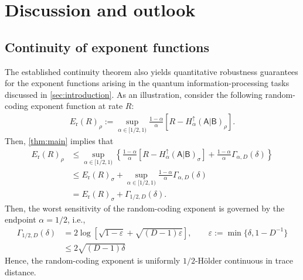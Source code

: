 \documentclass[11pt,reqno]{amsart}
\theoremstyle{definition}
\newcommand{\A}{\mathsf{A}}
\newcommand{\B}{\mathsf{B}}
\begin{document}
\section{Discussion and outlook}\label{sec:discussion}

\subsection{Continuity of exponent functions}
The established continuity theorem also yields quantitative robustness guarantees for
the exponent functions arising in the quantum information-processing tasks
discussed in \cref{sec:introduction}.  As an illustration, consider the
following random-coding exponent function at rate \(R\):
\begin{align}
    E_{\mathrm{r}}(R)_{\rho}
    := \sup_{\alpha \in [1/2,1)}  \frac{1-\alpha}{\alpha} \left[ R - H_{\alpha}^{\uparrow}(\A|\B)_{\rho} \right].
\end{align}
Then, \cref{thm:main} implies that
\begin{align}
    E_{\mathrm{r}}(R)_{\rho}
    &\leq \sup_{\alpha \in [1/2,1)} \left\{ \frac{1-\alpha}{\alpha} \left[ R - H_{\alpha}^{\uparrow}(\A|\B)_{\sigma} \right] + \frac{1-\alpha}{\alpha} \Gamma_{\alpha,D}(\delta) \right\}
    \\
    &\leq E_{\mathrm{r}}(R)_{\sigma} + \sup_{\alpha \in [1/2,1)} \frac{1-\alpha}{\alpha} \Gamma_{\alpha,D}(\delta)
    \\
    &= E_{\mathrm{r}}(R)_{\sigma} + \Gamma_{1/2,D}(\delta).
\end{align}
Then, the worst sensitivity of the random-coding exponent is governed by the endpoint $\alpha = 1/2$, i.e.,
\begin{align}
    \Gamma_{1/2,D}(\delta)
    &= 2 \log \left[ \sqrt{1-\varepsilon} + \sqrt{(D-1)\varepsilon} \right],
    \qquad \varepsilon := \min\{\delta, 1-D^{-1}\}
    \\
    &\leq
    2\sqrt{(D-1)\delta}
\end{align}
Hence, the random-coding exponent is uniformly $1/2$-H\"older continuous in trace distance.
\end{document}
